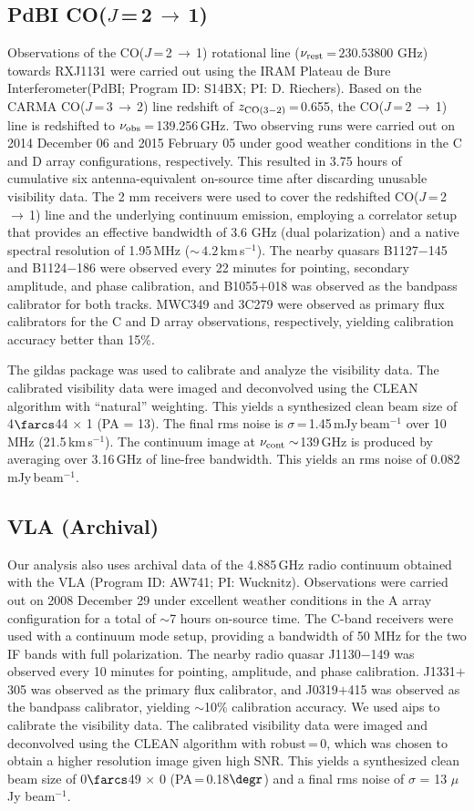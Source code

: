 \documentclass[]{emulateapj}
\newcommand{\rarr}{$\rightarrow$}
\newcommand{\bco}{\mbox{CO($J$\,=\,2\,\rarr\,1)}\xspace}
\newcommand{\cco}{\mbox{CO($J$\,=\,3\,\rarr\,2)}\xspace}
\newcommand{\kms}{\mbox{km\,s$^{-1}$}\xspace}
\newcommand{\pmOne}{\mbox{$^{-1}$}\xspace}
\newcommand{\eq}{\,=\,}
\def\pdbi     {Plateau de Bure Interferometer\xspace}
\newcommand{\ncode}[1]{{\sc #1}}
\begin{document}
\subsection{PdBI \bco}
Observations of the \bco rotational line
($\nu_{\rm rest}$\,=\,$230.53800$ GHz)
towards RXJ1131
were carried out using the IRAM \pdbi (PdBI; Program ID: S14BX; PI: D.
Riechers).
Based on the CARMA \cco line redshift of $z_{\rm CO(3-2)}$\eq0.655,
the \bco line is redshifted to $\nu_{\rm obs}$\eq139.256\,GHz.
Two observing runs were carried out on 2014 December 06 and 2015
February 05 under good weather conditions in the C and D array configurations,
respectively.
This resulted in 3.75 hours of cumulative six antenna-equivalent on-source
time after discarding unusable visibility data.
The 2 mm receivers were used to cover the redshifted \bco line
and the underlying continuum emission, employing a correlator setup that provides
an effective bandwidth of 3.6 GHz (dual polarization) and a native spectral resolution of 1.95\,MHz
($\sim$\,$4.2$\,\kms).
The nearby quasars B1127$-$145 and B1124$-$186 were observed every 22 minutes
for pointing, secondary amplitude, and phase calibration, and B1055$+$018 was
observed as the bandpass calibrator for both tracks.
MWC349 and 3C279 were observed as primary flux calibrators for the C and D
array observations, respectively, yielding calibration accuracy better than 15\%.

The \ncode{gildas} package was used to calibrate and analyze the visibility data.
The calibrated visibility data were imaged and deconvolved using the CLEAN algorithm with ``natural''
weighting. This yields a synthesized clean beam size of 4$\farcs$44 $\times$ 1 (PA = 13\degr).
The final rms noise is $\sigma$\,=\,1.45\,mJy\,beam\pmOne
over 10 MHz (21.5\,\kms). The continuum image at $\nu_{\rm cont}\sim$139\,GHz
is produced by averaging over 3.16\,GHz of line-free bandwidth. This
yields an rms noise of 0.082 mJy\,beam$^{-1}$.

\subsection{VLA (Archival)}
Our analysis also uses archival data of the 4.885\,GHz
radio continuum obtained with the
VLA (Program ID: AW741; PI: Wucknitz).
Observations were carried out on 2008 December 29 under excellent weather
conditions in the A array configuration for a total of $\sim$7 hours on-source time. The C-band receivers were used with a continuum mode setup,
providing a bandwidth of 50 MHz for the two IF bands with full polarization.
The nearby radio quasar J1130$-$149 was observed every 10 minutes for
pointing, amplitude, and phase calibration. J1331$+$305 was observed as the
primary flux calibrator, and J0319$+$415 was observed as the bandpass
calibrator, yielding $\sim$10\% calibration accuracy.
We used \ncode{aips} to calibrate the visibility data.
The calibrated visibility data were imaged and deconvolved using
the CLEAN algorithm with robust\,=\,0, which
was chosen to obtain a higher resolution image given high SNR.
This yields a synthesized clean
beam size of 0$\farcs$49 $\times$ 0 (PA\,=\,0.18$\degr$) and a final
rms noise of $\sigma$ = 13 $\mu$Jy beam\pmOne.
\end{document}
